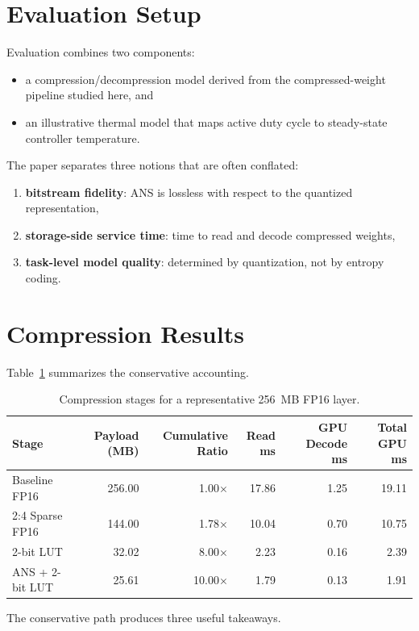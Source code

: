 \documentclass[11pt]{article}
\begin{document}
\section{Evaluation Setup}
Evaluation combines two components:
\begin{itemize}
    \item a compression/decompression model derived from the compressed-weight pipeline studied here, and
    \item an illustrative thermal model that maps active duty cycle to steady-state controller temperature.
\end{itemize}

The paper separates three notions that are often conflated:
\begin{enumerate}
    \item \textbf{bitstream fidelity}: ANS is lossless with respect to the quantized representation,
    \item \textbf{storage-side service time}: time to read and decode compressed weights,
    \item \textbf{task-level model quality}: determined by quantization, not by entropy coding.
\end{enumerate}

\section{Compression Results}
Table~\ref{tab:compression} summarizes the conservative accounting.

\begin{table}[t]
\centering
\caption{Compression stages for a representative 256~MB FP16 layer.}
\label{tab:compression}
\begin{tabular}{lrrrrr}
\toprule
Stage & Payload (MB) & Cumulative Ratio & Read ms & GPU Decode ms & Total GPU ms \\
\midrule
Baseline FP16 & 256.00 & 1.00$\times$ & 17.86 & 1.25 & 19.11 \\
2:4 Sparse FP16 & 144.00 & 1.78$\times$ & 10.04 & 0.70 & 10.75 \\
2-bit LUT & 32.02 & 8.00$\times$ & 2.23 & 0.16 & 2.39 \\
ANS + 2-bit LUT & 25.61 & 10.00$\times$ & 1.79 & 0.13 & 1.91 \\
\bottomrule
\end{tabular}
\end{table}

The conservative path produces three useful takeaways.
\end{document}
